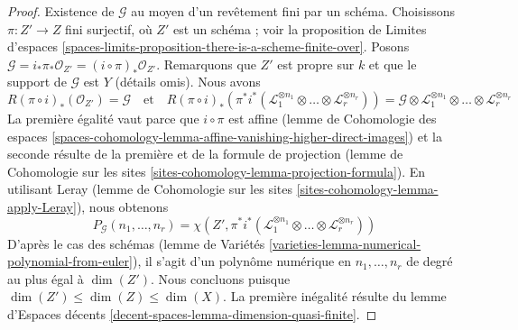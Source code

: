 \begin{proof}
\medskip\noindent
Existence de $\mathcal{G}$ au moyen d'un revêtement fini par un schéma.
Choisissons $\pi : Z' \to Z$ fini surjectif, où $Z'$ est un schéma ; voir la
proposition de Limites d'espaces
\ref{spaces-limits-proposition-there-is-a-scheme-finite-over}.
Posons $\mathcal{G} = i_*\pi_*\mathcal{O}_{Z'} = (i \circ \pi)_*\mathcal{O}_{Z'}$.
Remarquons que $Z'$ est propre sur $k$ et que le support de $\mathcal{G}$ est $Y$
(détails omis). Nous avons
$$
R(\pi \circ i)_*(\mathcal{O}_{Z'}) = \mathcal{G}
\quad\text{et}\quad
R(\pi \circ i)_*(\pi^*i^*(\mathcal{L}_1^{\otimes n_1} \otimes \ldots \otimes
\mathcal{L}_r^{\otimes n_r})
) = \mathcal{G} \otimes \mathcal{L}_1^{\otimes n_1} \otimes \ldots \otimes
\mathcal{L}_r^{\otimes n_r}
$$
La première égalité vaut parce que $i \circ \pi$ est affine
(lemme de Cohomologie des espaces
\ref{spaces-cohomology-lemma-affine-vanishing-higher-direct-images})
et la seconde résulte de la première et de la formule de projection
(lemme de Cohomologie sur les sites \ref{sites-cohomology-lemma-projection-formula}).
En utilisant Leray
(lemme de Cohomologie sur les sites \ref{sites-cohomology-lemma-apply-Leray}),
nous obtenons
$$
P_\mathcal{G}(n_1, \ldots, n_r) =
\chi(Z', \pi^*i^*(\mathcal{L}_1^{\otimes n_1} \otimes \ldots \otimes
\mathcal{L}_r^{\otimes n_r}))
$$
D'après le cas des schémas
(lemme de Variétés \ref{varieties-lemma-numerical-polynomial-from-euler}),
il s'agit d'un polynôme numérique en
$n_1, \ldots, n_r$ de degré au plus égal à $\dim(Z')$.
Nous concluons puisque $\dim(Z') \leq \dim(Z) \leq \dim(X)$.
La première inégalité résulte du
lemme d'Espaces décents \ref{decent-spaces-lemma-dimension-quasi-finite}.


\end{proof}
